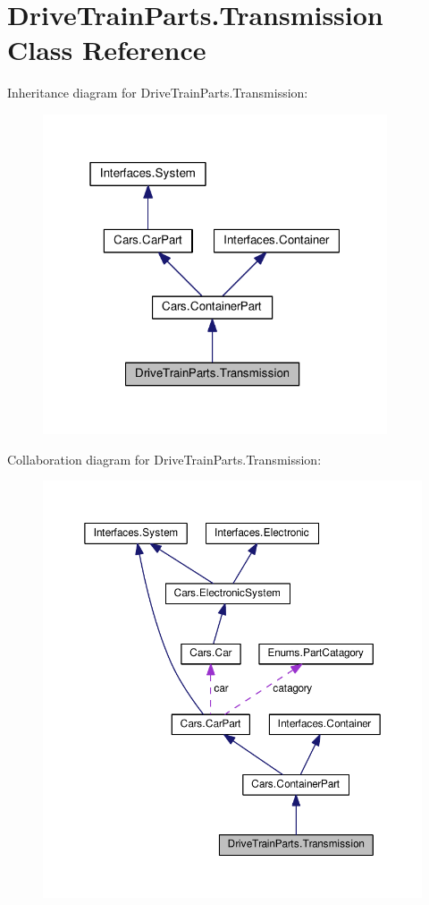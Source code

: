 \hypertarget{classDriveTrainParts_1_1Transmission}{}\section{Drive\+Train\+Parts.\+Transmission Class Reference}
\label{classDriveTrainParts_1_1Transmission}


Inheritance diagram for Drive\+Train\+Parts.\+Transmission\+:
\nopagebreak
\begin{figure}[H]
\begin{center}
\leavevmode
\includegraphics[width=289pt]{classDriveTrainParts_1_1Transmission__inherit__graph}
\end{center}
\end{figure}


Collaboration diagram for Drive\+Train\+Parts.\+Transmission\+:
\nopagebreak
\begin{figure}[H]
\begin{center}
\leavevmode
\includegraphics[width=350pt]{classDriveTrainParts_1_1Transmission__coll__graph}
\end{center}
\end{figure}
